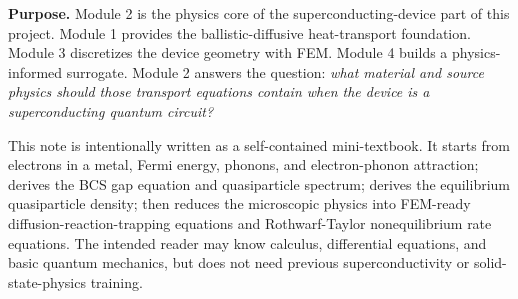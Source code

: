 \documentclass[11pt]{article}
\begin{document}

\begin{overviewbox}
\textbf{Purpose.} Module 2 is the physics core of the superconducting-device part of this project. Module 1 provides the ballistic-diffusive heat-transport foundation. Module 3 discretizes the device geometry with FEM. Module 4 builds a physics-informed surrogate. Module 2 answers the question: \emph{what material and source physics should those transport equations contain when the device is a superconducting quantum circuit?}

This note is intentionally written as a self-contained mini-textbook. It starts from electrons in a metal, Fermi energy, phonons, and electron-phonon attraction; derives the BCS gap equation and quasiparticle spectrum; derives the equilibrium quasiparticle density; then reduces the microscopic physics into FEM-ready diffusion-reaction-trapping equations and Rothwarf-Taylor nonequilibrium rate equations. The intended reader may know calculus, differential equations, and basic quantum mechanics, but does not need previous superconductivity or solid-state-physics training.
\end{overviewbox}

\ProjectTOC
\end{document}
